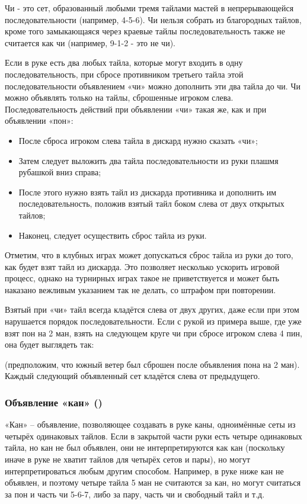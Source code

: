 Чи - это сет, образованный любыми тремя тайлами мастей в непрерывающейся последовательности (например, 4-5-6). Чи нельзя собрать из благородных тайлов, кроме того замыкающаяся через краевые тайлы последовательность также не считается как чи (например, 9-1-2 - это не чи).

Если в руке есть два любых тайла, которые могут входить в одну последовательность, при сбросе противником третьего тайла этой последовательности объявлением «чи» можно дополнить эти два тайла до чи. Чи можно объявлять только на тайлы, сброшенные игроком слева. Последовательность действий при объявлении «чи» такая же, как и при объявлении «пон»:

\begin{itemize}
	\item После сброса игроком слева тайла в дискард нужно сказать «чи»;
	\item Затем следует выложить два тайла последовательности из руки плашмя рубашкой вниз справа;
	\item После этого нужно взять тайл из дискарда противника и дополнить им последовательность, положив взятый тайл боком слева от двух открытых тайлов;
	\item Наконец, следует осуществить сброс тайла из руки.
\end{itemize}

Отметим, что в клубных играх может допускаться сброс тайла из руки до того, как будет взят тайл из дискарда. Это позволяет несколько ускорить игровой процесс, однако на турнирных играх такое не приветствуется и может быть наказано вежливым указанием так не делать, со штрафом при повторении.

Взятый при «чи» тайл всегда кладётся слева от двух других, даже если при этом нарушается порядок последовательности. Если с рукой из примера выше, где уже взят пон на 2 ман, взять на следующем круге чи при сбросе игроком слева 4 пин, она будет выглядеть так:

 \hfill {}

(предположим, что южный ветер был сброшен после объявления пона на 2 ман). Каждый следующий объявленный сет кладётся слева от предыдущего.

\subsubsection{Объявление «кан» ()}

«Кан» – объявление, позволяющее создавать в руке каны, одноимённые сеты из четырёх одинаковых тайлов. Если в закрытой части руки есть четыре одинаковых тайла, но кан не был объявлен, они не интерпретируются как кан (поскольку иначе в руке не хватит тайлов для четырёх сетов и пары), но могут интерпретироваться любым другим способом. Например, в руке ниже кан не объявлен, и поэтому четыре тайла 5 ман не считаются за кан, но могут считаться за пон и часть чи 5-6-7, либо за пару, часть чи и свободный тайл и т.д.

